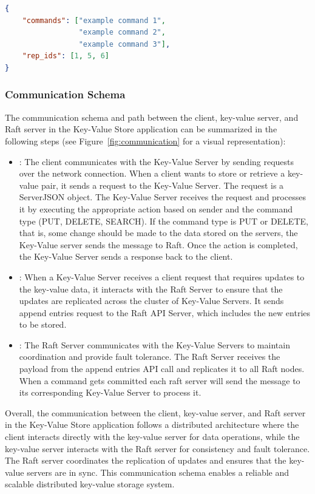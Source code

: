 \documentclass{article}
\begin{document}
\begin{lstlisting}[language=json, caption={RaftJSON},label={lst:RaftJSON}]
{
    "commands": ["example command 1",
                 "example command 2",
                 "example command 3"],
    "rep_ids": [1, 5, 6]
}
\end{lstlisting}

\subsubsection{Communication Schema}
The communication schema and path between the client, key-value server, and Raft server in the
Key-Value Store application can be summarized in the following steps (see Figure~\ref{fig:communication} for
a visual representation):
\begin{itemize}
    \item {}: The client communicates with the Key-Value Server
    by sending requests over the network connection. When a client wants to store or retrieve
    a key-value pair, it sends a request to the Key-Value Server. The request is a ServerJSON
    object. The Key-Value Server receives the request and processes it by executing the
    appropriate action based on sender and the command type (PUT, DELETE, SEARCH). If the
    command type is PUT or DELETE, that is, some change should be made to the data stored on
    the servers, the Key-Value server sends the message to Raft. Once the action is completed, 
    the Key-Value Server sends a response back to the client.
    \item {}: When a Key-Value Server
    receives a client request that requires updates to the key-value data, it interacts with
    the Raft Server to ensure that the updates are replicated across the cluster of Key-Value
    Servers. It sends append entries request to the Raft API Server, which includes the new entries
    to be stored.
    \item {}: The Raft Server communicates with the Key-Value
    Servers to maintain coordination and provide fault tolerance. The Raft Server receives the
    payload from the append entries API call and replicates it to all Raft nodes. When a command
    gets committed each raft server will send the message to its corresponding Key-Value Server 
    to process it.
\end{itemize}

Overall, the communication between the client, key-value server, and Raft server in the Key-Value
Store application follows a distributed architecture where the client interacts directly with the
key-value server for data operations, while the key-value server interacts with the Raft server
for consistency and fault tolerance. The Raft server coordinates the replication of updates and
ensures that the key-value servers are in sync. This communication schema enables a reliable and
scalable distributed key-value storage system.


%
%
\end{document}

